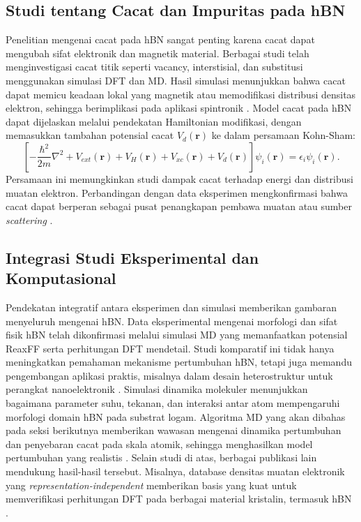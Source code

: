 \subsection{Studi tentang Cacat dan Impuritas pada hBN}
Penelitian mengenai cacat pada hBN sangat penting karena cacat dapat mengubah sifat elektronik dan magnetik material.
Berbagai studi telah menginvestigasi cacat titik seperti vacancy, interstisial, dan substitusi menggunakan simulasi DFT dan MD.
Hasil simulasi menunjukkan bahwa cacat dapat memicu keadaan lokal yang magnetik atau memodifikasi distribusi densitas elektron, sehingga berimplikasi pada aplikasi spintronik \citep{Zhang2020}.
Model cacat pada hBN dapat dijelaskan melalui pendekatan Hamiltonian modifikasi, dengan memasukkan tambahan potensial cacat \(V_d(\mathbf{r})\) ke dalam persamaan Kohn-Sham:
\begin{equation}
    \left[-\frac{\hbar^2}{2m}\nabla^2 + V_{ext}(\mathbf{r}) + V_H(\mathbf{r}) + V_{xc}(\mathbf{r}) + V_d(\mathbf{r})\right]\psi_i(\mathbf{r}) = \epsilon_i \psi_i(\mathbf{r}).
\end{equation}
Persamaan ini memungkinkan studi dampak cacat terhadap energi dan distribusi muatan elektron.
Perbandingan dengan data eksperimen mengkonfirmasi bahwa cacat dapat berperan sebagai pusat penangkapan pembawa muatan atau sumber \emph{scattering} \citep{Zhang2020}.

\subsection{Integrasi Studi Eksperimental dan Komputasional}
Pendekatan integratif antara eksperimen dan simulasi memberikan gambaran menyeluruh mengenai hBN.
Data eksperimental mengenai morfologi dan sifat fisik hBN telah dikonfirmasi melalui simulasi MD yang memanfaatkan potensial ReaxFF serta perhitungan DFT mendetail.
Studi komparatif ini tidak hanya meningkatkan pemahaman mekanisme pertumbuhan hBN, tetapi juga memandu pengembangan aplikasi praktis, misalnya dalam desain heterostruktur untuk perangkat nanoelektronik \citep{Lele2022}.
Simulasi dinamika molekuler menunjukkan bagaimana parameter suhu, tekanan, dan interaksi antar atom mempengaruhi morfologi domain hBN pada substrat logam.
Algoritma MD yang akan dibahas pada seksi berikutnya memberikan wawasan mengenai dinamika pertumbuhan dan penyebaran cacat pada skala atomik, sehingga menghasilkan model pertumbuhan yang realistis \citep{Lele2022}.
Selain studi di atas, berbagai publikasi lain mendukung hasil-hasil tersebut.
Misalnya, database densitas muatan elektronik yang \emph{representation-independent} memberikan basis yang kuat untuk memverifikasi perhitungan DFT pada berbagai material kristalin, termasuk hBN \citep{Shen2022}.

